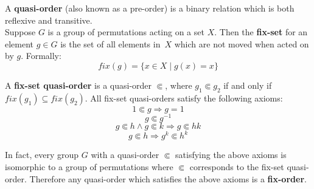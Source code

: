\documentclass[landscape,a1paper,fontscale=0.48,final]{baposter}
\begin{document}
\begin{poster}
{	A {\bf quasi-order} (also known as a pre-order) is a binary relation which is both reflexive and transitive. \\

	Suppose $G$ is a group of permutations acting on a set $X$. Then the {\bf fix-set} for an element $g \in G$ is the set of all elements in~$X$ which are not moved when acted on by $g$.
	Formally:
	\begin{displaymath} fix(g) = \{ x \in X \mid g(x) = x \} \end{displaymath}

	A {\bf fix-set quasi-order} is a quasi-order $\Subset$, where $ g_1 \Subset g_2$ if and only if $fix(g_1) \subseteq fix(g_2)$. All fix-set quasi-orders satisfy the following axioms:
	\begin{equation} 1 \Subset g \Rightarrow g = 1  \end{equation}
	\begin{equation} g \Subset g^{-1} \end{equation}
	\begin{equation} g \Subset h \wedge g \Subset k \Rightarrow g \Subset hk \end{equation}
	\begin{equation} g \Subset h \Rightarrow g^k \Subset h^k \end{equation}

	In fact, every group $G$ with a quasi-order $\Subset$ satisfying the above axioms is isomorphic to a group of permutations where $\Subset$ corresponds to the fix-set quasi-order. Therefore any quasi-order which satisfies the above axioms is a {\bf fix-order}.
  }
\end{poster}
\end{document}
